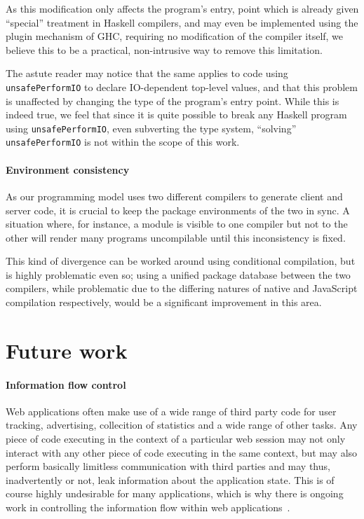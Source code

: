 \documentclass[preprint]{sigplanconf}
\begin{document}
As this modification only affects the program's entry, point which is already
given ``special'' treatment in Haskell compilers, and may even be implemented
using the plugin mechanism of GHC, requiring no modification of the compiler
itself, we believe this to be a practical, non-intrusive way to remove this
limitation.

The astute reader may notice that the same applies to code using
\lstinline!unsafePerformIO! to declare IO-dependent top-level values, and that
this problem is unaffected by changing the type of the program's entry point.
While this is indeed true, we feel that since it is quite possible to break
any Haskell program using \lstinline!unsafePerformIO!, even subverting the type
system, ``solving'' \lstinline!unsafePerformIO! is not within the scope of this
work.

\paragraph{Environment consistency} As our programming model uses two different
compilers to generate client and server code, it is crucial to keep the package
environments of the two in sync. A situation where, for instance, a module is
visible to one compiler but not to the other will render many programs
uncompilable until this inconsistency is fixed.

This kind of divergence can be worked around using conditional compilation, but
is highly problematic even so; using a unified package database between the two
compilers, while problematic due to the differing natures of native and
JavaScript compilation respectively, would be a significant improvement in this
area.

\section{Future work}

\paragraph{Information flow control} Web applications often make use of a wide
range of third party code for user tracking, advertising, collecition of
statistics and a wide range of other tasks. Any piece of code executing in the
context of a particular web session may not only interact with any other piece
of code executing in the same context, but may also perform basically limitless
communication with third parties and may thus, inadvertently or not, leak
information about the application state. This is of course highly undesirable
for many applications, which is why there is ongoing work in controlling the
information flow within web applications\ \cite{jsflow}.
\end{document}
